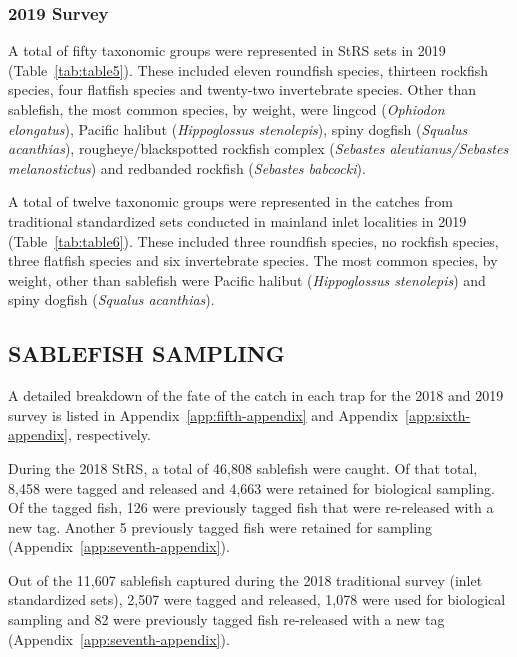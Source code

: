 \documentclass[12pt]{article}\usepackage[]{graphicx}\usepackage[]{color}
\begin{document}
\hypertarget{survey-3}{%
\subsubsection{2019 Survey}\label{survey-3}}

A total of fifty taxonomic groups were represented in StRS sets in 2019 (Table~\ref{tab:table5}). These included eleven roundfish species, thirteen rockfish species, four flatfish species and twenty-two invertebrate species. Other than sablefish, the most common species, by weight, were lingcod (\emph{Ophiodon elongatus}), Pacific halibut (\emph{Hippoglossus stenolepis}), spiny dogfish (\emph{Squalus acanthias}), rougheye/blackspotted rockfish complex (\emph{Sebastes aleutianus/Sebastes melanostictus}) and redbanded rockfish (\emph{Sebastes babcocki}).

A total of twelve taxonomic groups were represented in the catches from traditional standardized sets conducted in mainland inlet localities in 2019 (Table~\ref{tab:table6}). These included three roundfish species, no rockfish species, three flatfish species and six invertebrate species. The most common species, by weight, other than sablefish were Pacific halibut (\emph{Hippoglossus stenolepis}) and spiny dogfish (\emph{Squalus acanthias}).

\hypertarget{sablefish-sampling}{%
\subsection{SABLEFISH SAMPLING}\label{sablefish-sampling}}

A detailed breakdown of the fate of the catch in each trap for the 2018 and 2019 survey is listed in Appendix~\ref{app:fifth-appendix} and Appendix~\ref{app:sixth-appendix}, respectively.

During the 2018 StRS, a total of 46,808 sablefish were caught. Of that total, 8,458 were tagged and released and 4,663 were retained for biological sampling. Of the tagged fish, 126 were previously tagged fish that were re-released with a new tag. Another 5 previously tagged fish were retained for sampling (Appendix~\ref{app:seventh-appendix}).

Out of the 11,607 sablefish captured during the 2018 traditional survey (inlet standardized sets), 2,507 were tagged and released, 1,078 were used for biological sampling and 82 were previously tagged fish re-released with a new tag (Appendix~\ref{app:seventh-appendix}).
\end{document}

